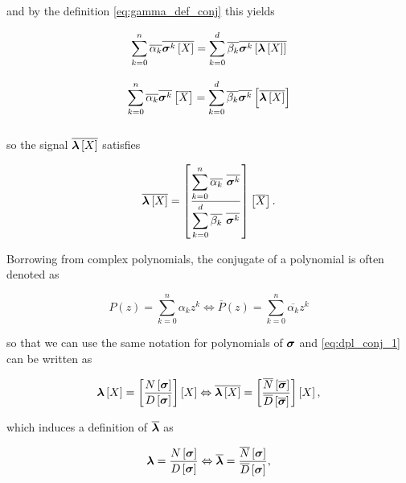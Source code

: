 	\noindent and by the definition \eqref{eq:gamma_def_conj} this yields

\begin{gather}
	\sum_{k=0}^n \overline{\alpha_k} \overline{\boldsymbol{\sigma}^{k}\left[X\right]} = \sum_{k=0}^d \overline{\beta_k} \overline{\boldsymbol{\sigma}^{k}\left[\boldsymbol{\lambda}\left[X\right]\right]} \nonumber\\[3mm]
	\sum_{k=0}^n \overline{\alpha_k} \overline{\boldsymbol{\sigma}^{k}}\left[\overline{X}\right] = \sum_{k=0}^d \overline{\beta_k} \overline{\boldsymbol{\sigma}^{k}}\left[\overline{\boldsymbol{\lambda}\left[X\right]}\right] \nonumber\\[3mm]
\end{gather}

	\noindent so the signal $\overline{\boldsymbol{\lambda}\left[X\right]}$ satisfies

\begin{equation} \overline{\dpL\left[X\right]} = \left[\dfrac{\displaystyle \sum_{k=0}^n \overline{\alpha_k}\ \overline{\ndpo{k}}}{\displaystyle\sum_{k=0}^d \overline{\beta_k}\ \overline{\ndpo{k}}}\right] \left[\overline{X}\right] .\label{eq:dpl_conj_1}\end{equation}

	Borrowing from complex polynomials, the conjugate of a polynomial is often denoted as

\begin{equation} P(z) = \sum_{k=0}^n \alpha_k z^k \Leftrightarrow \overline{P}(z) = \sum_{k=0}^n \overline{\alpha_k} z^k \end{equation}

	\noindent so that we can use the same notation for polynomials of $\boldsymbol{\sigma}$ and \eqref{eq:dpl_conj_1} can be written as

\begin{equation} \boldsymbol{\lambda}\left[X\right] = \left[\dfrac{N\left[\boldsymbol{\sigma}\right]}{D\left[\boldsymbol{\sigma}\right]}\right]\left[X\right] \Leftrightarrow \overline{\boldsymbol{\lambda}\left[X\right]} = \left[\dfrac{\overline{N}\left[\overline{\boldsymbol{\sigma}}\right]}{\overline{D}\left[\overline{\boldsymbol{\sigma}}\right]}\right]\left[X\right] ,\label{eq:dpl_conj_2}\end{equation}

	\noindent which induces a definition of $\overline{\boldsymbol{\lambda}}$ as

\begin{equation} \boldsymbol{\lambda} = \dfrac{N\left[\boldsymbol{\sigma}\right]}{D\left[\boldsymbol{\sigma}\right]} \Leftrightarrow \overline{\boldsymbol{\lambda}} = \dfrac{\overline{N}\left[\boldsymbol{\sigma}\right]}{\overline{D}\left[\boldsymbol{\sigma}\right]} ,\label{eq:dpl_conj_3}\end{equation}

